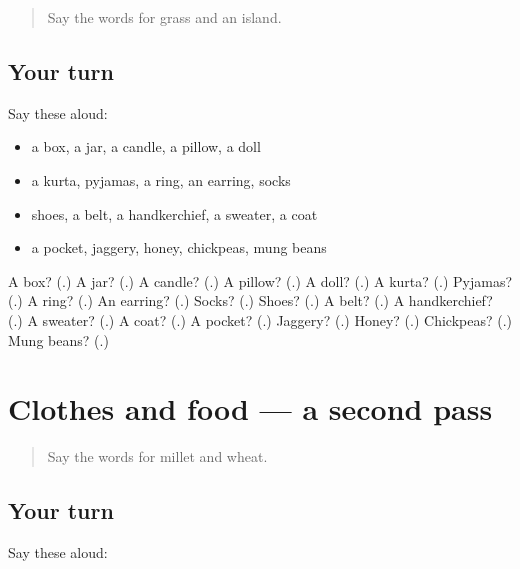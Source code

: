 \label{lesson:GU-R118-first-pass-the-house-and-clothes}



\begin{quote}
Say the words for grass and an island.
\end{quote}

\subsection*{Your turn}
Say these aloud:

\begin{itemize}
\raggedright
  \item a box, a jar, a candle, a pillow, a doll
  \item a kurta, pyjamas, a ring, an earring, socks
  \item shoes, a belt, a handkerchief, a sweater, a coat
  \item a pocket, jaggery, honey, chickpeas, mung beans
\end{itemize}

\begin{tcolorbox}[breakable,colback=teal!4,colframe=teal!35!black,title={Before you move on}]
A box? (\textbf{}.) A jar? (\textbf{}.) A candle? (\textbf{}.) A pillow? (\textbf{}.) A doll? (\textbf{}.) A kurta? (\textbf{}.) Pyjamas? (\textbf{}.) A ring? (\textbf{}.) An earring? (\textbf{}.) Socks? (\textbf{}.) Shoes? (\textbf{}.) A belt? (\textbf{}.) A handkerchief? (\textbf{}.) A sweater? (\textbf{}.) A coat? (\textbf{}.) A pocket? (\textbf{}.) Jaggery? (\textbf{}.) Honey? (\textbf{}.) Chickpeas? (\textbf{}.) Mung beans? (\textbf{}.)
\end{tcolorbox}
\section[(dialogue)]{Clothes and food — a second pass}

\label{lesson:GU-R118-second-pass-clothes-and-food}



\begin{quote}
Say the words for millet and wheat.
\end{quote}

\subsection*{Your turn}
Say these aloud:

